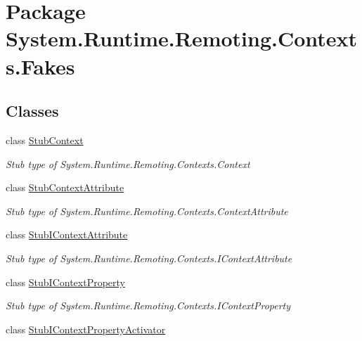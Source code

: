 \hypertarget{namespace_system_1_1_runtime_1_1_remoting_1_1_contexts_1_1_fakes}{\section{Package System.\-Runtime.\-Remoting.\-Contexts.\-Fakes}
\label{namespace_system_1_1_runtime_1_1_remoting_1_1_contexts_1_1_fakes}
}
\subsection*{Classes}
\begin{DoxyCompactItemize}
\item 
class \hyperlink{class_system_1_1_runtime_1_1_remoting_1_1_contexts_1_1_fakes_1_1_stub_context}{Stub\-Context}
\begin{DoxyCompactList}\small\item\em Stub type of System.\-Runtime.\-Remoting.\-Contexts.\-Context\end{DoxyCompactList}\item 
class \hyperlink{class_system_1_1_runtime_1_1_remoting_1_1_contexts_1_1_fakes_1_1_stub_context_attribute}{Stub\-Context\-Attribute}
\begin{DoxyCompactList}\small\item\em Stub type of System.\-Runtime.\-Remoting.\-Contexts.\-Context\-Attribute\end{DoxyCompactList}\item 
class \hyperlink{class_system_1_1_runtime_1_1_remoting_1_1_contexts_1_1_fakes_1_1_stub_i_context_attribute}{Stub\-I\-Context\-Attribute}
\begin{DoxyCompactList}\small\item\em Stub type of System.\-Runtime.\-Remoting.\-Contexts.\-I\-Context\-Attribute\end{DoxyCompactList}\item 
class \hyperlink{class_system_1_1_runtime_1_1_remoting_1_1_contexts_1_1_fakes_1_1_stub_i_context_property}{Stub\-I\-Context\-Property}
\begin{DoxyCompactList}\small\item\em Stub type of System.\-Runtime.\-Remoting.\-Contexts.\-I\-Context\-Property\end{DoxyCompactList}\item 
class \hyperlink{class_system_1_1_runtime_1_1_remoting_1_1_contexts_1_1_fakes_1_1_stub_i_context_property_activator}{Stub\-I\-Context\-Property\-Activator}

\end{DoxyCompactItemize}
